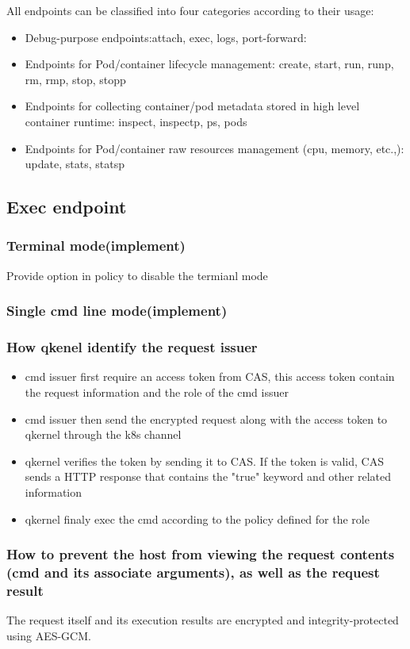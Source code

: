 All endpoints can be classified into four categories according to their usage:
\begin{itemize}
    \item  Debug-purpose endpoints:attach, exec, logs, port-forward:
    \item  Endpoints for Pod/container lifecycle management: create, start, run, runp, rm, rmp, stop, stopp
    \item  Endpoints for collecting container/pod metadata stored in high level container runtime: inspect, inspectp, ps, pods
    \item  Endpoints for Pod/container raw resources management (cpu, memory, etc.,): update, stats, statsp
\end{itemize}

\subsection{Exec endpoint}
\subsubsection{Terminal mode(implement)}
Provide option in policy to disable the termianl mode


\subsubsection{Single cmd line mode(implement)}
\subsubsection{How qkenel identify the request issuer}
\begin{itemize}
    \item  cmd issuer first require an access token from CAS, this access token contain the request information and the role of the cmd issuer
    \item  cmd issuer then send the encrypted request along with the access token to qkernel through the k8s channel
    \item  qkernel verifies the token by sending it to CAS. If the token is valid, CAS sends a HTTP response that contains the "true" keyword and other related information
    \item  qkernel finaly exec the cmd according to the policy defined for the role
\end{itemize}
\subsubsection{How to prevent the host from viewing the request contents (cmd and its associate arguments), as well as the request result}
The request itself and its execution results are encrypted and integrity-protected using AES-GCM.

